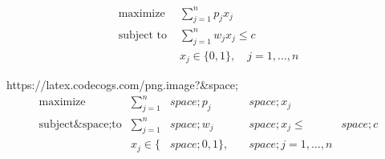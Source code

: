 \begin{align*}
\text{maximize } & \sum_{j=1}^n p_j x_j \\
\text{subject to } & \sum_{j=1}^n w_j x_j \leq c \\
& x_j \in \lbrace 0, 1 \rbrace, \quad j = 1, \ldots,n
\end{align*}


https://latex.codecogs.com/png.image?\large&space;\begin{align*}\text{maximize}&\sum_{j=1}^n&space;p_j&space;x_j\\\text{subject&space;to}&\sum_{j=1}^n&space;w_j&space;x_j\leq&space;c\\&x_j\in\lbrace&space;0,1\rbrace,\quad&space;j=1,\ldots,n\end{align*}
